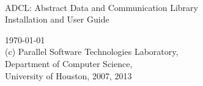 \documentclass[11pt]{article}
\begin{document}
\begin{titlepage}
 \begin{center}
  \vfill
  {~}
  \vfill
  \vfill
  \vfill
  \vfill
  \vfill

    {\Large
      ADCL: Abstract Data and Communication Library \\
      Installation and User Guide \par}
  \vfill
  \today\\
  \vfill
     {\large (c) Parallel Software Technologies Laboratory, \\
       Department of Computer Science, \\
       University of Houston, 2007, 2013}\\
  \vfill
  \vfill
  \vfill
  \vfill
\end{center}                                                     
\end{titlepage}


\tableofcontents
\cleardoublepage


\pagewiselinenumbers






%


\end{document}
